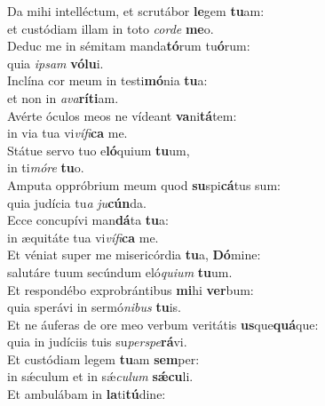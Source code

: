 \evenverse Da mihi intelléctum, et scrutábor \textbf{le}gem \textbf{tu}am:~\*\\
\evenverse et custódiam illam in toto \textit{cor}\textit{de} \textbf{me}o.\\
\oddverse Deduc me in sémitam manda\textbf{tó}rum tu\textbf{ó}rum:~\*\\
\oddverse quia \textit{i}\textit{psam} \textbf{vó}\textbf{lu}i.\\
\evenverse Inclína cor meum in testi\textbf{mó}nia \textbf{tu}a:~\*\\
\evenverse et non in \textit{a}\textit{va}\textbf{rí}\textbf{ti}am.\\
\oddverse Avérte óculos meos ne vídeant \textbf{va}ni\textbf{tá}tem:~\*\\
\oddverse in via tua vi\textit{ví}\textit{fi}\textbf{ca} me.\\
\evenverse Státue servo tuo e\textbf{ló}quium \textbf{tu}um,~\*\\
\evenverse in ti\textit{mó}\textit{re} \textbf{tu}o.\\
\oddverse Amputa oppróbrium meum quod \textbf{su}spi\textbf{cá}tus sum:~\*\\
\oddverse quia judícia tu\textit{a} \textit{ju}\textbf{cún}da.\\
\evenverse Ecce concupívi man\textbf{dá}ta \textbf{tu}a:~\*\\
\evenverse in æquitáte tua vi\textit{ví}\textit{fi}\textbf{ca} me.\\
\oddverse Et véniat super me misericórdia \textbf{tu}a, \textbf{Dó}mine:~\*\\
\oddverse salutáre tuum secúndum eló\textit{qui}\textit{um} \textbf{tu}um.\\
\evenverse Et respondébo exprobrántibus \textbf{mi}hi \textbf{ver}bum:~\*\\
\evenverse quia sperávi in sermó\textit{ni}\textit{bus} \textbf{tu}is.\\
\oddverse Et ne áuferas de ore meo verbum veritátis \textbf{us}que\textbf{quá}que:~\*\\
\oddverse quia in judíciis tuis su\textit{per}\textit{spe}\textbf{rá}vi.\\
\evenverse Et custódiam legem \textbf{tu}am \textbf{sem}per:~\*\\
\evenverse in sǽculum et in sǽ\textit{cu}\textit{lum} \textbf{sǽ}\textbf{cu}li.\\
\oddverse Et ambulábam in \textbf{la}ti\textbf{tú}dine:~\*\\
